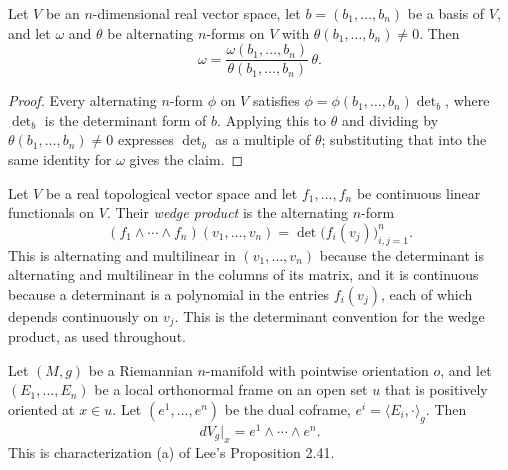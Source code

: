 \begin{lemma}
\label{lem:top-forms-proportional}
\leanok
Let $V$ be an $n$-dimensional real vector space, let $b = (b_1, \ldots, b_n)$ be a basis of $V$,
and let $\omega$ and $\theta$ be alternating $n$-forms on $V$ with
$\theta(b_1, \ldots, b_n) \ne 0$. Then
\[
\omega = \frac{\omega(b_1, \ldots, b_n)}{\theta(b_1, \ldots, b_n)} \, \theta .
\]
\end{lemma}

\begin{proof}
\leanok
Every alternating $n$-form $\phi$ on $V$ satisfies $\phi = \phi(b_1,\ldots,b_n) \det\nolimits_b$,
where $\det_b$ is the determinant form of $b$. Applying this to $\theta$ and dividing by
$\theta(b_1,\ldots,b_n) \ne 0$ expresses $\det_b$ as a multiple of $\theta$; substituting that
into the same identity for $\omega$ gives the claim.
\end{proof}

\begin{definition}
\label{def:wedge-covectors}
\leanok
Let $V$ be a real topological vector space and let $f_1, \ldots, f_n$ be continuous linear
functionals on $V$. Their \emph{wedge product} is the alternating $n$-form
\[
(f_1 \wedge \cdots \wedge f_n)(v_1, \ldots, v_n) = \det \bigl( f_i(v_j) \bigr)_{i,j=1}^{n} .
\]
This is alternating and multilinear in $(v_1, \ldots, v_n)$ because the determinant is
alternating and multilinear in the columns of its matrix, and it is continuous because a
determinant is a polynomial in the entries $f_i(v_j)$, each of which depends continuously on
$v_j$. This is the determinant convention for the wedge product, as used throughout.
\end{definition}

\begin{proposition}
\label{prop:volume-form-coframe}
\leanok
{}
Let $(M,g)$ be a Riemannian $n$-manifold with pointwise orientation $o$, and let
$(E_1, \ldots, E_n)$ be a local orthonormal frame on an open set $u$ that is positively oriented
at $x \in u$. Let $(e^1, \ldots, e^n)$ be the dual coframe, $e^i = \langle E_i, \cdot \rangle_g$.
Then
\[
dV_g|_x = e^1 \wedge \cdots \wedge e^n .
\]
This is characterization (a) of Lee's Proposition 2.41.
\end{proposition}

